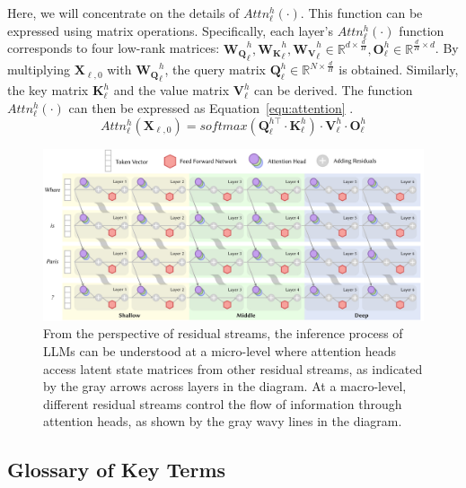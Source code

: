 \documentclass{article}
\begin{document}
Here, we will concentrate on the details of $Attn_{\ell}^{h}\left(\cdot\right)$. This function can be expressed using matrix operations.
Specifically, each layer's $Attn_{\ell}^{h}\left(\cdot\right)$ function corresponds to four low-rank matrices: $\mathbf{W_Q}_{\ell}^{h}, \mathbf{W_K}_{\ell}^{h}, \mathbf{W_V}_{\ell}^{h} \in \mathbb{R}^{d \times \frac{d}{H}}, \mathbf{O}_{\ell}^{h} \in \mathbb{R}^{\frac{d}{H} \times d}$. By multiplying $\mathbf{X}_{\ell,0}$ with $\mathbf{W_Q}_{\ell}^{h}$, the query matrix $\mathbf{Q}_{\ell}^{h} \in \mathbb{R}^{N \times \frac{d}{H}}$ is obtained. Similarly, the key matrix $\mathbf{K}_{\ell}^{h}$ and the value matrix $\mathbf{V}_{\ell}^{h}$ can be derived.
The function $Attn_{\ell}^{h}\left(\cdot\right)$ can then be expressed as Equation~\ref{equ:attention} \citep{AttentionIsAllYouNeed}.
\begin{equation} \label{equ:attention}
    Attn_{\ell}^{h}\left(\mathbf{X}_{\ell,0}\right) = softmax\left(\mathbf{Q}_{\ell}^{h\top} \cdot \mathbf{K}_{\ell}^{h}\right) \cdot \mathbf{V}_{\ell}^{h} \cdot \mathbf{O}_{\ell}^{h}
\end{equation}

\begin{figure}[htbp]
    \centering
    \includegraphics[width=\linewidth]{figures/residual_stream.pdf}
    \caption{From the perspective of residual streams, the inference process of LLMs can be understood at a micro-level where attention heads access latent state matrices from other residual streams, as indicated by the gray arrows across layers in the diagram. At a macro-level, different residual streams control the flow of information through attention heads, as shown by the gray wavy lines in the diagram.}
    \label{fig:ResidualStream}
\end{figure}


\subsection{Glossary of Key Terms} \label{subsec:KeyTerm}

\end{document}
